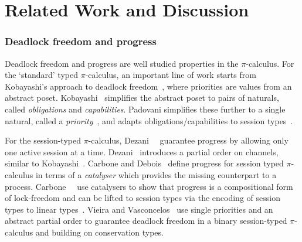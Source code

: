 \section{Related Work and Discussion}

\subsubsection*{Deadlock freedom and progress}
Deadlock freedom and progress are well studied properties in the $\pi$-calculus.
For the `standard' typed $\pi$-calculus, an important line of work starts from Kobayashi's approach to deadlock freedom~\cite{kobayashi98}, where priorities are values from an abstract poset. Kobayashi~\cite{kobayashi06} simplifies the abstract poset to pairs of naturals, called \emph{obligations} and \emph{capabilities}. Padovani simplifies these further to a single natural, called a \emph{priority}~\cite{padovani14}, and adapts obligations/capabilities to session types~\cite{padovani13}.


For the session-typed $\pi$-calculus, Dezani~\etal~\cite{dezani-ciancaglinimostrous06} guarantee progress by allowing only one active session at a time. Dezani~\cite{dezani-ciancagliniliguoro09progress} introduces a partial order on channels, similar to Kobayashi~\cite{kobayashi98}.
Carbone and Debois~\cite{carbonedebois10} define progress for session typed $\pi$-calculus in terms of a \emph{catalyser} which provides the missing counterpart to a process. Carbone~\etal~\cite{carbonedardha14} use catalysers to show that progress is a compositional form of lock-freedom and can be lifted to session types via the encoding of session types to linear types~\cite{kobayashi07,dardhagiachino12,dardha14beat}.
Vieira and Vasconcelos~\cite{vieiravasconcelos13} use single priorities and an abstract partial order to guarantee deadlock freedom in a binary session-typed $\pi$-calculus and building on conservation types.

